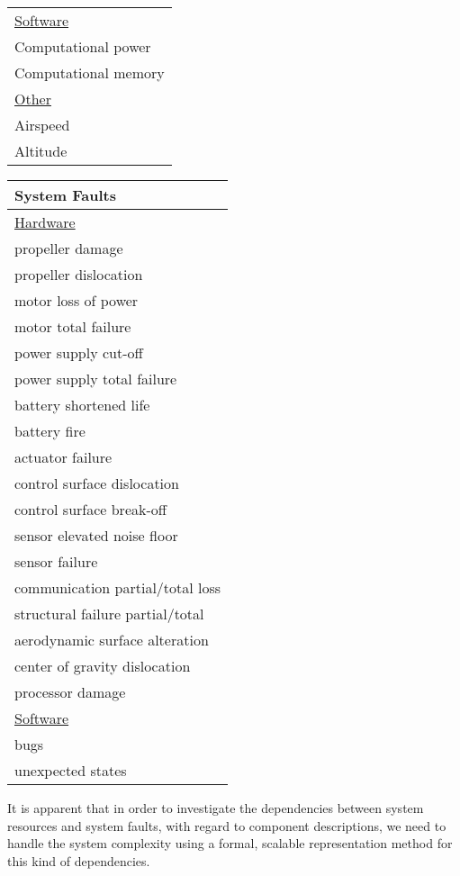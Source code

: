 \begin{table}[rc]
\begin{minipage}[t]{0.45\textwidth}
\begin{tabular}{l}
\underline{Software} \\
Computational power \\
Computational memory \vspace{5pt} \\
\underline{Other}\\
Airspeed \\
Altitude
\end{tabular}
\end{minipage} %
%
\begin{minipage}[t]{0.45\textwidth}
\vspace{0pt}
\begin{tabular}{l}
{\textbf{System Faults}}\\
\hline
\underline{Hardware} \\
propeller damage \\
propeller dislocation \\
motor loss of power \\
motor total failure \\
power supply cut-off \\
power supply total failure \\
battery shortened life \\
battery fire \\
actuator failure \\
control surface dislocation\\
control surface break-off\\
sensor elevated noise floor \\
sensor failure\\
communication partial/total loss\\
structural failure partial/total\\
aerodynamic surface alteration\\
center of gravity dislocation \\
processor damage \vspace{5pt}\\
\underline{Software}\\
bugs\\
unexpected states
\end{tabular}
\end{minipage} %

\end{table}

It is apparent that in order to investigate the dependencies between system resources and system faults, with regard to component descriptions, we need to handle the system complexity using a formal, scalable representation method for this kind of dependencies.